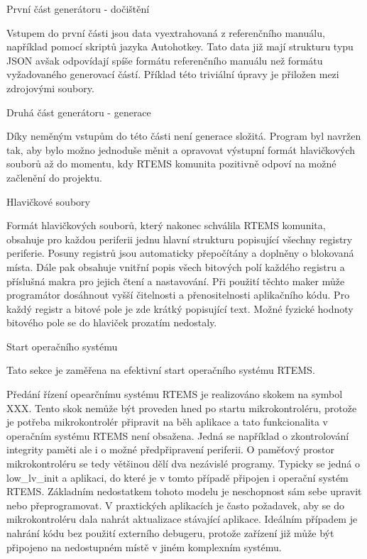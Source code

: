 \secc První část generátoru - dočištění

	Vstupem do první části jsou data vyextrahovaná z referenčního manuálu, například pomocí skriptů jazyka Autohotkey. Tato data již mají strukturu typu JSON avšak odpovídají spíše formátu referenčního manuálu než formátu vyžadovaného generovací částí. Příklad této triviální úpravy je přiložen mezi zdrojovými soubory.

\secc Druhá část generátoru - generace

	Díky neměným vstupům do této části není generace složitá. Program byl navržen tak, aby bylo možno jednoduše měnit a opravovat výstupní formát hlavičkových souborů až do momentu, kdy RTEMS komunita pozitivně odpoví na možné začlenění do projektu.

\secc Hlavičkové soubory

	Formát hlavičkových souborů, který nakonec schválila RTEMS komunita, obsahuje pro každou periferii jednu hlavní strukturu popisující všechny registry periferie. Posuny registrů jsou automaticky přepočítány a doplněny o blokovaná místa. Dále pak obsahuje vnitřní popis všech bitových polí každého registru a příslušná makra pro jejich čtení a nastavování. Při použití těchto maker může programátor dosáhnout vyšší čitelnosti a přenositelnosti aplikačního kódu. Pro každý registr a bitové pole je zde krátký popisující text. Možné fyzické hodnoty bitového pole se do hlaviček prozatím nedostaly.

\sec Start operačního systému

	Tato sekce je zaměřena na efektivní start operačního systému RTEMS.

	Předání řízení opearčnímu systému RTEMS je realizováno skokem na symbol XXX. Tento skok nemůže být proveden hned po startu mikrokontroléru, protože je potřeba mikrokontrolér připravit na běh aplikace a tato funkcionalita v operačním systému RTEMS není obsažena. Jedná se například o zkontrolování integrity paměti ale i o možné předpřipravení periferii. O paměťový prostor mikrokontroléru se tedy většinou dělí dva nezávislé programy. Typicky se jedná o low\_lv\_init a aplikaci, do které je v tomto případě připojen i operační systém RTEMS. Základním nedostatkem tohoto modelu je neschopnost sám sebe upravit nebo přeprogramovat. V praxtických aplikacích je často požadavek, aby se do mikrokontroléru dala nahrát aktualizace stávající aplikace. Ideálním případem je nahrání kódu bez použití externího debugeru, protože zařízení již může být připojeno na nedostupném místě v jiném komplexním systému.

